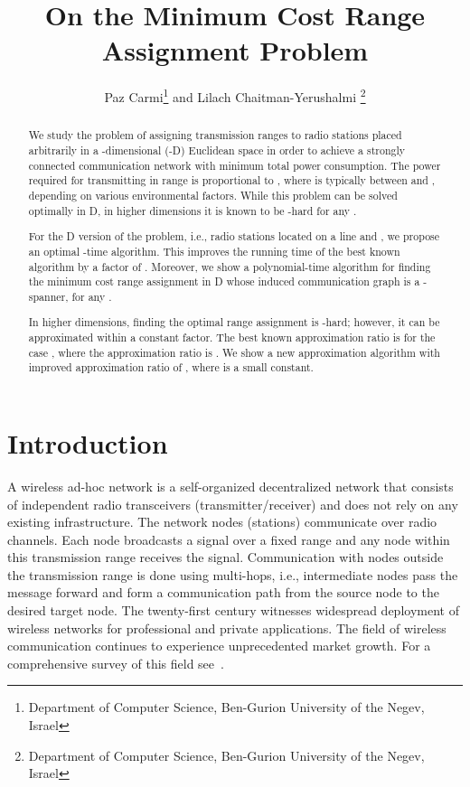 \documentclass[a4paper]{article}
\title{On the Minimum Cost Range Assignment Problem
}
\author{Paz Carmi\footnote{Department of Computer Science, Ben-Gurion University of the Negev, Israel}
 and Lilach Chaitman-Yerushalmi
\footnote{Department of Computer Science, Ben-Gurion University of the Negev, Israel}}
\begin{document}
\maketitle



\begin{abstract}
We study the problem of assigning transmission ranges to radio stations  
placed arbitrarily in a -dimensional (-D) Euclidean space in order to achieve a strongly connected communication network
with minimum total power consumption.
The power required for transmitting in range  is proportional to ,
where  is typically between  and , depending on various environmental factors.
While this problem can be solved optimally in D, in higher dimensions it is known to be -hard for any .

For the D version of the problem, i.e., radio stations located on a line and , 
we propose an optimal -time algorithm. 
This improves the running time of the best known algorithm by a factor of .
Moreover, we show a polynomial-time algorithm for finding the minimum cost range assignment in D
whose induced communication graph is a -spanner, for any  .

In higher dimensions, finding the optimal range assignment is -hard;
however, it can be approximated within a constant factor. 
The best known approximation ratio is for the case , where the approximation ratio is .
We show a new approximation algorithm with improved approximation ratio of , where  is a small constant.
\end{abstract}





\section{Introduction}\label{sec:Intro}
A wireless ad-hoc  network is a self-organized decentralized network that consists of independent radio transceivers (transmitter/receiver) 
and does not rely on any existing infrastructure. The network nodes (stations) communicate over radio channels. 
Each node broadcasts a signal over a fixed range and any node within this transmission range receives the signal.
Communication with nodes outside the transmission range is done using multi-hops, i.e., intermediate nodes pass the message forward 
and form a communication path from the source node to the desired target node.
The twenty-first century witnesses widespread deployment of wireless networks for professional and private
applications. The field of wireless communication continues to experience unprecedented market growth. 
For a comprehensive survey of this field see~\cite{pahlavan2005}.
\end{document}
